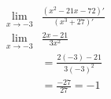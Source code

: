 
\begin{align}
	\lim_{x \rightarrow -3}& \frac{\left(x^2 - 21x - 72\right)'}{\left(x^3 + 27\right)'} \\
	\lim_{x \rightarrow -3}& \frac{2x - 21}{3x^2} \\
	&= \frac{2(-3) - 21}{3(-3)^2} \\
	&= \frac{-27}{27} = -1
\end{align}
